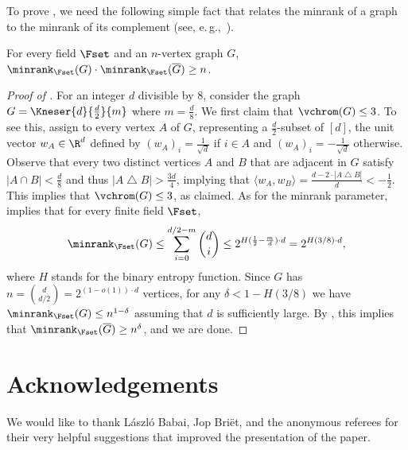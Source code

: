 To prove , we need the following simple fact that relates the minrank of a graph to the minrank of its complement (see, e.\,g.,~\cite[Remark~2.2]{Peeters96}).

\begin{fact}\label{fact:minrank_comp}
For every field $\Fset$ and an $n$-vertex graph $G$, $\minrank_{\Fset}(G) \cdot \minrank_{\Fset}(\overline{G}) \geq n$.
\end{fact}

\begin{proof}[Proof of ]
For an integer $d$ divisible by $8$, consider the graph $G = \Kneser{d}{\frac{d}{2}}{m}$ where $m = \frac{d}{8}$.
We first claim that $\vchrom(G) \leq 3$.
To see this, assign to every vertex $A$ of $G$, representing a $\frac{d}{2}$-subset of $[d]$, the unit vector $w_A \in \R^d$ defined by $(w_A)_i = \frac{1}{\sqrt{d}}$ if $i \in A$ and $(w_A)_i = - \frac{1}{\sqrt{d}}$ otherwise.
Observe that every two distinct vertices $A$ and $B$ that are adjacent in $G$ satisfy $|A \cap B| < \frac{d}{8}$ and thus $|A \bigtriangleup B| > \frac{3d}{4}$, implying that $\langle w_A, w_B \rangle = \frac{d-2 \cdot |A \bigtriangleup B|}{d} < -\frac{1}{2}$. This implies that $\vchrom(G) \leq 3$, as claimed.
As for the minrank parameter,  implies that for every finite field $\Fset$,
\[{\minrank}_{\Fset}(G) \leq \sum_{i=0}^{d/2-m}\binom{d}{i} \leq 2^{H(\frac{1}{2}-\frac{m}{d}) \cdot d} = 2^{H(3/8) \cdot d},\]
where $H$ stands for the binary entropy function.
Since $G$ has $n = \binom{d}{d/2} = 2^{(1-o(1)) \cdot d}$ vertices, for any $\delta < 1- H(3/8)$ we have ${\minrank}_{\Fset}(G) \leq n^{1-\delta}$ assuming that $d$ is sufficiently large. By , this implies that
${\minrank}_{\Fset}(\overline{G}) \geq n^{\delta}$, and we are done.
\end{proof}

\section*{Acknowledgements}
%
%
We would like to thank L{\'{a}}szl{\'{o}} Babai, Jop Bri{\"{e}}t, and the anonymous referees for their very helpful suggestions that improved the presentation of the paper.
